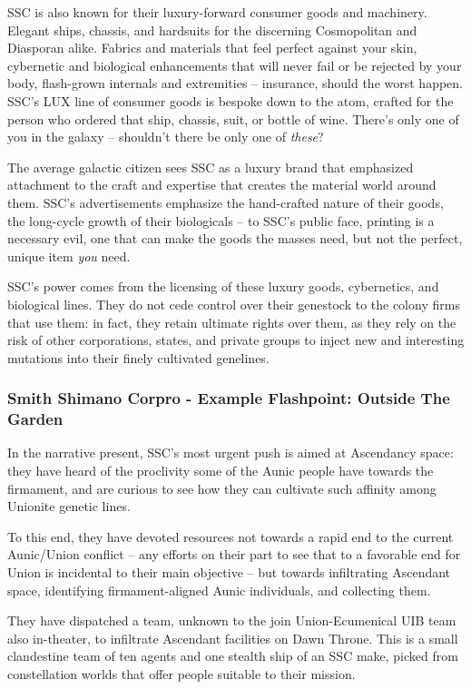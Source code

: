 SSC is also known for their luxury-forward consumer goods and machinery. Elegant ships,
chassis, and hardsuits for the discerning Cosmopolitan and Diasporan alike. Fabrics and
materials that feel perfect against your skin, cybernetic and biological enhancements that will
never fail or be rejected by your body, flash-grown internals and extremities -- insurance, should
the worst happen. SSC's LUX line of consumer goods is bespoke down to the atom, crafted for
the person who ordered that ship, chassis, suit, or bottle of wine. There's only one of you in the
galaxy -- shouldn't there be only one of \textit{these}?

The average galactic citizen sees SSC as a luxury brand that emphasized attachment to the craft
and expertise that creates the material world around them. SSC's advertisements emphasize the
hand-crafted nature of their goods, the long-cycle growth of their biologicals -- to SSC's public
face, printing is a necessary evil, one that can make the goods the masses need, but not the
perfect, unique item \textit{you} need.

SSC's power comes from the licensing of these luxury goods, cybernetics, and biological lines.
They do not cede control over their genestock to the colony firms that use them: in fact, they
retain ultimate rights over them, as they rely on the risk of other corporations, states, and private
groups to inject new and interesting mutations into their finely cultivated genelines.

\subsubsection[Example Flashpoint: Outside The Garden]{Smith Shimano Corpro - Example Flashpoint: Outside The Garden  }

In the narrative present, SSC's most urgent push is aimed at Ascendancy space: they have heard
of the proclivity some of the Aunic people have towards the firmament, and are curious to see
how they can cultivate such affinity among Unionite genetic lines.

To this end, they have devoted resources not towards a rapid end to the current Aunic/Union
conflict -- any efforts on their part to see that to a favorable end for Union is incidental to their
main objective -- but towards infiltrating Ascendant space, identifying firmament-aligned Aunic
individuals, and collecting them.

They have dispatched a team, unknown to the join Union-Ecumenical UIB team also in-theater,
to infiltrate Ascendant facilities on Dawn Throne. This is a small clandestine team of ten agents
and one stealth ship of an SSC make, picked from constellation worlds that offer people suitable
to their mission.

